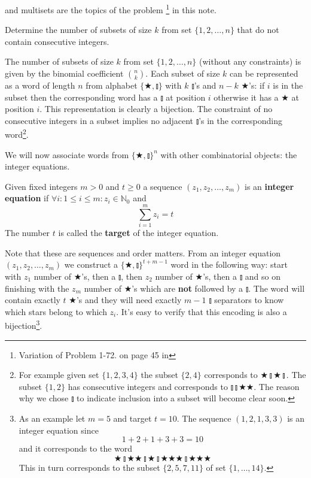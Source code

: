  and multisets are the topics of the problem \footnote{Variation of Problem 1-72. on page 45 in } in this note.

\vspace{10 mm}
\begin{problem}
Determine the number of subsets of size $k$ from set $\{1, 2, \ldots, n\}$ that do not contain consecutive integers.
\end{problem}

The number of subsets of size $k$ from set $\{1, 2, \ldots, n\}$ (without any constraints) is given by the binomial coefficient $\binom{n}{k}$. Each subset of size $k$ can be represented as a word of length $n$ from alphabet $\{\bigstar, \talloblong\}$ with $k$ $\talloblong$'s and $n-k$ $\bigstar$'s: if $i$ is in the subset then the corresponding word has a $\talloblong$ at position $i$ otherwise it has a $\bigstar$ at position $i$. This representation is clearly a bijection. The constraint of no consecutive integers in a subset implies no adjacent $\talloblong$'s in the corresponding word\footnote{For example given set $\{1, 2, 3, 4\}$ the subset $\{2, 4\}$ corresponds to $\bigstar\talloblong\bigstar\talloblong$. The subset $\{1, 2\}$ has consecutive integers and corresponds to $\talloblong\talloblong\bigstar\bigstar$. The reason why we chose $\talloblong$ to indicate inclusion into a subset will become clear soon.}.

We will now associate words from $\{\bigstar, \talloblong\}^n$ with other combinatorial objects: the integer equations.

\begin{defn}
Given fixed integers $m > 0$ and $t \geq 0$ a sequence $(z_1, z_2, \ldots, z_m)$ is an \textbf{integer equation} if $\forall i: 1 \leq i \leq m: z_i \in \mathbb{N}_0$ and
$$
\sum_{i = 1}^m z_i = t
$$
The number $t$ is called the \textbf{target}	of the integer equation.
\end{defn}

Note that these are sequences and order matters. From an integer equation $(z_1, z_2, \ldots, z_m)$ we construct a $\{\bigstar, \talloblong\}^{t + m - 1}$ word in the following way: start with $z_1$ number of $\bigstar$'s, then a $\talloblong$, then $z_2$ number of $\bigstar$'s, then a $\talloblong$ and so on finishing with the $z_m$ number of $\bigstar$'s which are \textbf{not} followed by a $\talloblong$. The word will contain exactly $t$ $\bigstar$'s and they will need exactly $m - 1$ $\talloblong$ separators to know which stars belong to which $z_i$. It's easy to verify that this encoding is also a bijection\footnote{As an example let $m = 5$ and target $t = 10$. The sequence $(1, 2, 1, 3, 3)$ is an integer equation since 
$$
1 + 2 + 1 + 3 + 3 = 10
$$ 
and it corresponds to the word 
$$
\bigstar\talloblong\bigstar\bigstar\talloblong\bigstar\talloblong\bigstar\bigstar\bigstar\talloblong\bigstar\bigstar\bigstar
$$
This in turn corresponds to the subset $\{2, 5, 7, 11\}$ of set $\{1, \ldots, 14\}$.}.

